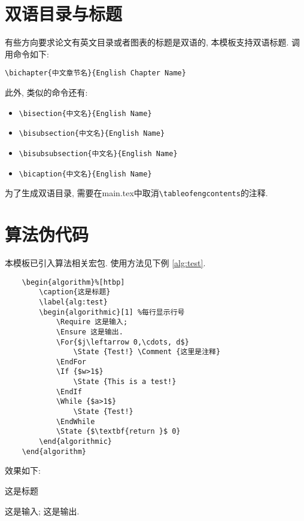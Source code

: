 \section{双语目录与标题}
有些方向要求论文有英文目录或者图表的标题是双语的, 本模板支持双语标题. 调用命令如下:
\begin{verbatim}
\bichapter{中文章节名}{English Chapter Name}
\end{verbatim}
此外, 类似的命令还有: 
\begin{itemize}
\item \verb|\bisection{中文名}{English Name}|
\item \verb|\bisubsection{中文名}{English Name}|
\item \verb|\bisubsubsection{中文名}{English Name}|
\item \verb|\bicaption{中文名}{English Name}|
\end{itemize}

为了生成双语目录, 需要在main.tex中取消\verb|\tableofengcontents|的注释.

\section{算法伪代码}
本模板已引入算法相关宏包. 使用方法见下例 \ref{alg:test}.
\begin{verbatim}
    \begin{algorithm}%[htbp]
        \caption{这是标题}
        \label{alg:test}
        \begin{algorithmic}[1] %每行显示行号
            \Require 这是输入;
            \Ensure 这是输出.
            \For{$j\leftarrow 0,\cdots, d$}
                \State {Test!} \Comment {这里是注释}
            \EndFor
            \If {$w>1$}
                \State {This is a test!}
            \EndIf
            \While {$a>1$}
                \State {Test!}
            \EndWhile
            \State {$\textbf{return }$ 0}
        \end{algorithmic}
    \end{algorithm}
\end{verbatim}

效果如下:
\begin{algorithm}%
    \caption{这是标题}
    \label{alg:test}
    \begin{algorithmic}[1] %
        \Require 这是输入;
        \Ensure 这是输出.
             
        \EndFor
        \EndIf
        \EndWhile
    \end{algorithmic}
\end{algorithm}


